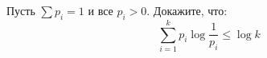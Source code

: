 Пусть $\sum p_i = 1$ и все $p_i > 0$. Докажите, что:
$$
    \sum\limits_{i = 1}^{k} p_i \log \frac{1}{p_i} \le \log k
$$